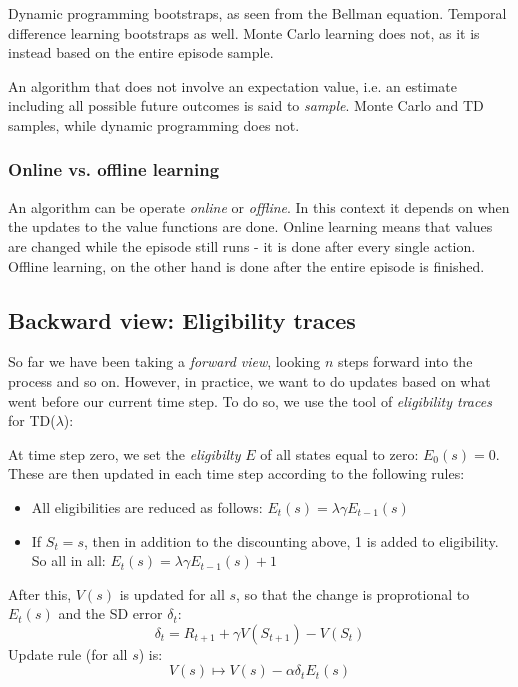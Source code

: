 \documentclass[12pt, a4paper]{article}
\numberwithin{equation}{section}
\begin{document}
Dynamic programming bootstraps, as seen from the Bellman equation. Temporal difference learning bootstraps as well. Monte Carlo learning does not, as it is instead based on the entire episode sample.

An algorithm that does not involve an expectation value, i.e. an estimate including all possible future outcomes is said to \textit{sample}. Monte Carlo and TD samples, while dynamic programming does not.

\subsubsection{Online vs. offline learning}
An algorithm can be operate \textit{online} or \textit{offline}. In this context it depends on when the updates to the value functions are done. Online learning means that values are changed while the episode still runs - it is done after every single action. Offline learning, on the other hand is done after the entire episode is finished.

\subsection{Backward view: Eligibility traces}
So far we have been taking a \textit{forward view}, looking $n$ steps forward into the process and so on. However, in practice, we want to do updates based on what went before our current time step. To do so, we use the tool of \textit{eligibility traces} for TD($\lambda$):

At time step zero, we set the \textit{eligibilty} $E$ of all states equal to zero: $E_0(s)=0$. These are then updated in each time step according to the following rules:
\begin{itemize}
\item All eligibilities are reduced as follows: $E_t(s)=\lambda\gamma E_{t-1}(s)$
\item If $S_t=s$, then in addition to the discounting above, 1 is added to eligibility. So all in all: $E_t(s)=\lambda\gamma E_{t-1}(s)+1$
\end{itemize}
After this, $V(s)$ is updated for all $s$, so that the change is proprotional to $E_t(s)$ and the SD error $\delta_t$:
\begin{equation}
\delta_t=R_{t+1}+\gamma V(S_{t+1})-V(S_t)
\label{delta_def}
\end{equation}
Update rule (for all $s$) is:
\begin{equation}
V(s)\mapsto V(s)-\alpha\delta_t E_t(s)
\end{equation}
\end{document}
